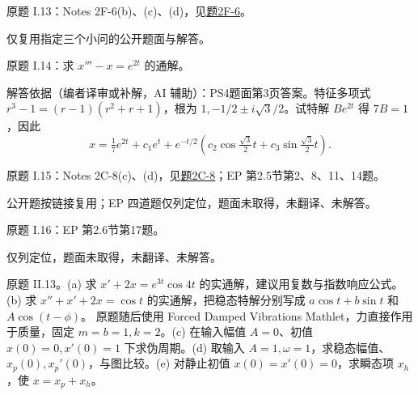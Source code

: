 \label{cw:ps4}
\begin{exercise}\label{cw:ps4-I-13}原题 I.13：Notes 2F-6(b)、(c)、(d)，见\hyperref[cw:bank-2F-6]{题2F-6}。\end{exercise}
\begin{solution}仅复用指定三个小问的公开题面与解答。\end{solution}
\begin{exercise}\label{cw:ps4-I-14}原题 I.14：求 $x'''-x=e^{2t}$ 的通解。\end{exercise}
\begin{solution}
解答依据（编者译审或补解，AI 辅助）：PS4题面第3页答案。特征多项式 $r^3-1=(r-1)(r^2+r+1)$，根为 $1,-1/2\pm i\sqrt3/2$。试特解 $Be^{2t}$ 得 $7B=1$，因此
\[
 x=\tfrac17e^{2t}+c_1e^t+e^{-t/2}
 \left(c_2\cos\tfrac{\sqrt3}2t+c_3\sin\tfrac{\sqrt3}2t\right).
\]
\end{solution}
\begin{exercise}\label{cw:ps4-I-15}原题 I.15：Notes 2C-8(c)、(d)，见\hyperref[cw:bank-2C-8]{题2C-8}；EP 第2.5节第2、8、11、14题。\end{exercise}
\begin{solution}公开题按链接复用；EP 四道题仅列定位，题面未取得，未翻译、未解答。\end{solution}
\begin{exercise}\label{cw:ps4-I-16}原题 I.16：EP 第2.6节第17题。\end{exercise}
\begin{solution}仅列定位，题面未取得，未翻译、未解答。\end{solution}
\begin{exercise}\label{cw:ps4-II-13}
原题 II.13。(a) 求 $x'+2x=e^{3t}\cos4t$ 的实通解，建议用复数与指数响应公式。(b) 求 $x''+x'+2x=\cos t$ 的实通解，把稳态特解分别写成 $a\cos t+b\sin t$ 和 $A\cos(t-\phi)$。
原题随后使用 Forced Damped Vibrations Mathlet，力直接作用于质量，固定 $m=b=1,k=2$。(c) 在输入幅值 $A=0$、初值 $x(0)=0,x'(0)=1$ 下求伪周期。(d) 取输入 $A=1,\omega=1$，求稳态幅值、$x_p(0),x_p'(0)$，与图比较。(e) 对静止初值 $x(0)=x'(0)=0$，求瞬态项 $x_h$，使 $x=x_p+x_h$。
\end{exercise}

